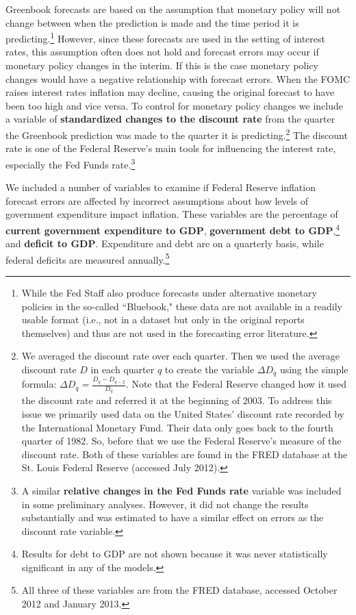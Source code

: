 \documentclass[a4paper]{article}\usepackage[]{graphicx}\usepackage[]{color}
\begin{document}
Greenbook forecasts are based on the assumption that monetary policy will not change between when the prediction is made and the time period it is predicting.\footnote{While the Fed Staff also produce forecasts under alternative monetary policies in the so-called ``Bluebook," these data are not available in a readily usable format (i.e., not in a dataset but only in the original reports themselves) and thus are not used in the forecasting error literature.} However, since these forecasts are used in the setting of interest rates, this assumption often does not hold and forecast errors may occur if monetary policy changes in the interim. If this is the case monetary policy changes would have a negative relationship with forecast errors. When the FOMC raises interest rates inflation may decline, causing the original forecast to have been too high and vice versa. To control for monetary policy changes we include a variable of {\bf{standardized changes to the discount rate}} from the quarter the Greenbook prediction was made to the quarter it is predicting.\footnote{We averaged the discount rate over each quarter. Then we used the average discount rate $D$ in each quarter $q$ to create the variable $\Delta D_{q}$ using the simple formula: $\Delta D_{q} = \frac{D_{q} - D_{q-2}}{D_{q}}$. Note that the Federal Reserve changed how it used the discount rate and referred it at the beginning of 2003. To address this issue we primarily used data on the United States' discount rate recorded by the International Monetary Fund. Their data only goes back to the fourth quarter of 1982. So, before that we use the Federal Reserve's measure of the discount rate. Both of these variables are found in the FRED database at the St. Louis Federal Reserve (accessed July 2012). } The discount rate is one of the Federal Reserve's main tools for influencing the interest rate, especially the Fed Funds rate.\footnote{A similar {\bf{relative changes in the Fed Funds rate}} variable was included in some preliminary analyses. However, it did not change the results substantially and was estimated to have a similar effect on errors as the discount rate variable.}

We included a number of variables to examine if Federal Reserve inflation forecast errors are affected by incorrect assumptions about how levels of government expenditure impact inflation. These variables are the percentage of {\bf{current government expenditure to GDP}}, {\bf{government debt to GDP}},\footnote{Results for debt to GDP are not shown because it was never statistically significant in any of the models.} and \textbf{deficit to GDP}. Expenditure and debt are on a quarterly basis, while federal deficits are measured annually.\footnote{All three of these variables are from the FRED database, accessed October 2012 and January 2013.}
\end{document}
